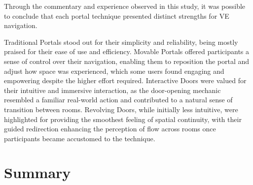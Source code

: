 Through the commentary and experience observed in this study, it was possible to conclude that each portal technique 
presented distinct strengths for \gls{VE} navigation. 

Traditional Portals stood out for their simplicity and reliability, being mostly praised for their ease of use and efficiency. 
Movable Portals offered participants a sense of control over their navigation, enabling them to reposition the portal and adjust 
how space was experienced, which some users found engaging and empowering despite the higher effort required. 
Interactive Doors were valued for their intuitive and immersive interaction, as the door-opening mechanic resembled a 
familiar real-world action and contributed to a natural sense of transition between rooms. 
Revolving Doors, while initially less intuitive, were highlighted for providing the smoothest feeling of spatial continuity, 
with their guided redirection enhancing the perception of flow across rooms once participants became accustomed to the technique.

\section{Summary}
\label{sec:summary}


